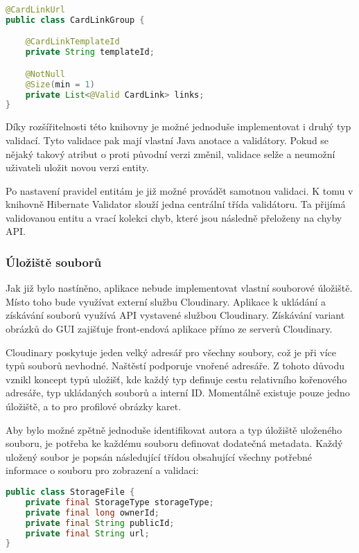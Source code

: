 		\begin{lstlisting}[language=Java, caption={Ukázka třídy s validačními pravidly pomocí Java anotací. Zdroj: [autor]}]
@CardLinkUrl
public class CardLinkGroup {

	@CardLinkTemplateId
	private String templateId;

	@NotNull
	@Size(min = 1)
	private List<@Valid CardLink> links;
}
		\end{lstlisting}

		Díky rozšířitelnosti této knihovny je možné jednoduše implementovat i druhý typ validací.
		Tyto validace pak mají vlastní Java anotace a validátory.
		Pokud se nějaký takový atribut o proti původní verzi změnil, validace selže a neumožní uživateli
		uložit novou verzi entity.

		Po nastavení pravidel entitám je již možné provádět samotnou validaci.
		K tomu v knihovně Hibernate Validator slouží jedna centrální třída validátoru.
		Ta přijímá validovanou entitu a vrací kolekci chyb, které jsou následně přeloženy na chyby \ac{API}.

		\subsubsection{Úložiště souborů}

		Jak již bylo nastíněno, aplikace nebude implementovat vlastní souborové úložiště.
		Místo toho bude využívat externí službu Cloudinary.
		Aplikace k ukládání a získávání souborů využívá \ac{API} vystavené službou Cloudinary.
		Získávání variant obrázků do \ac{GUI} zajišťuje front-endová aplikace přímo ze serverů Cloudinary.

		Cloudinary poskytuje jeden velký adresář pro všechny soubory, což je při více typů souborů nevhodné.
		Naštěstí podporuje vnořené adresáře.
		Z tohoto důvodu vznikl koncept typů uložišť, kde každý typ definuje cestu
		relativního kořenového adresáře, typ ukládaných souborů a interní ID.
		Momentálně existuje pouze jedno úložiště, a to pro profilové obrázky karet.

		Aby bylo možné zpětně jednoduše identifikovat autora a typ úložiště uloženého souboru, je potřeba ke každému
		souboru definovat dodatečná metadata.
		Každý uložený soubor je popsán následující třídou obsahující všechny potřebné informace o souboru pro zobrazení
		a validaci:

		\begin{lstlisting}[language=Java, caption={Třída popisující uložený soubor v Cloudinary. Zdroj: [autor]}]
public class StorageFile {
    private final StorageType storageType;
    private final long ownerId;
    private final String publicId;
    private final String url;
}
		\end{lstlisting}

